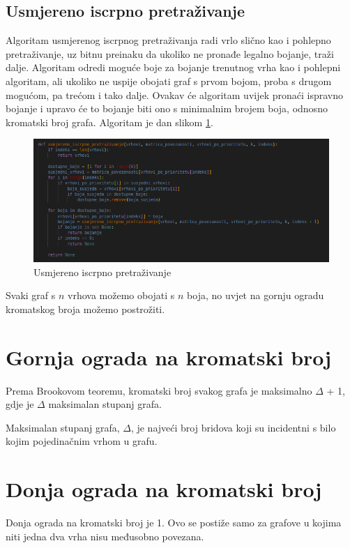 \documentclass[times, utf8, zavrsni]{fer}
\begin{document}
\subsection{Usmjereno iscrpno pretraživanje}
Algoritam usmjerenog iscrpnog pretraživanja radi vrlo slično kao i pohlepno pretraživanje, uz bitnu preinaku da ukoliko ne pronađe legalno bojanje, traži dalje. Algoritam odredi moguće boje za bojanje trenutnog vrha kao i pohlepni algoritam, ali ukoliko ne uspije obojati graf s prvom bojom, proba s drugom mogućom, pa trećom i tako dalje. Ovakav će algoritam uvijek pronaći ispravno bojanje i upravo će to bojanje biti ono s minimalnim brojem boja, odnosno kromatski broj grafa. Algoritam je dan slikom \ref{fig:iscrpno usmjereno pretrazivanje}.

\begin{figure}[htb]
\centering
\includegraphics[width=12cm]{images/iscrpno_usmjereno_pretrazivanje.png}
\caption{Usmjereno iscrpno pretraživanje}
\label{fig:iscrpno usmjereno pretrazivanje}
\end{figure}

Svaki graf s $n$ vrhova možemo obojati s $n$ boja, no uvjet na gornju ogradu kromatskog broja možemo postrožiti.

\section{Gornja ograda na kromatski broj}
Prema Brookovom teoremu, kromatski broj svakog grafa je maksimalno $\Delta$ + 1, gdje je $\Delta$ maksimalan stupanj grafa. 

Maksimalan stupanj grafa, $\Delta$, je najveći broj bridova koji su incidentni s bilo kojim pojedinačnim vrhom u grafu.

\section{Donja ograda na kromatski broj}
Donja ograda na kromatski broj je 1. Ovo se postiže samo za grafove u kojima niti jedna dva vrha nisu međusobno povezana.
\end{document}
